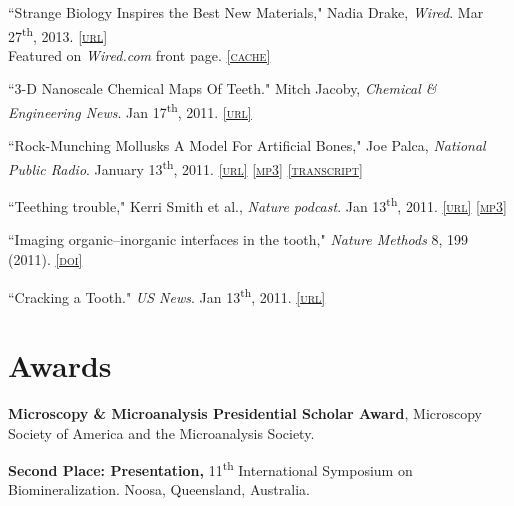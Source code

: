 ``Strange Biology Inspires the Best New Materials," Nadia Drake, \emph{Wired}. Mar 27\textsuperscript{th}, 2013. \href{http://www.wired.com/wiredscience/2013/03/biomimetic-materials/?utm_source=feedburner&utm_medium=feed&utm_campaign=Feed%3A+wired%2Findex+%28Wired%3A+Top+Stories%29&pid=6577}{\textsc{\footnotesize{[url]}}}\\ Featured on \emph{Wired.com} front page. \href{http://lylegordon.ca/wired.jpg}{\textsc{\footnotesize{[cache]}}}

 ``3-D Nanoscale Chemical Maps Of Teeth." Mitch Jacoby, \emph{Chemical \& Engineering News}. Jan 17\textsuperscript{th}, 2011. \href{http://pubs.acs.org/cen/science/89/8903scic1.html?utm_source=feedburner&utm_medium=feed&utm_campaign=Feed%3A+cen_nano+%28Chemical+And+Engineering+News+NanoFocus%29}{\textsc{\footnotesize{[url]}}}

``Rock-Munching Mollusks A Model For Artificial Bones," Joe Palca, \emph{National Public Radio}. January 13\textsuperscript{th}, 2011. \href{http://www.npr.org/2011/01/13/132859853/rock-munching-mollusks-a-model-for-artificial-bones}{\textsc{\footnotesize{[url]}}} \href{http://lylegordon.ca/audio/npr-2011-01-13.mp3}{\textsc{\footnotesize{[mp3]}}}  \href{http://lylegordon.ca/nprtranscript.html}{\textsc{\footnotesize{[transcript]}}}

``Teething trouble," Kerri Smith et al., \emph{Nature podcast}. Jan 13\textsuperscript{th}, 2011. \href{http://www.nature.com/nature/podcast/index-2011-01-13.html}{\textsc{\footnotesize{[url]}}} \href{http://lylegordon.ca/audio/nature-2011-01-13.mp3}{\textsc{\footnotesize{[mp3]}}}

``Imaging organic--inorganic interfaces in the tooth," \emph{Nature Methods} 8, 199 (2011). \href{http://dx.doi.org/10.1038/nmeth0311-199}{\textsc{\footnotesize{[doi]}}}

 ``Cracking a Tooth." \emph{US News}. Jan 13\textsuperscript{th}, 2011. \href{http://www.usnews.com/science/articles/2011/01/13/cracking-a-tooth}{\textsc{\footnotesize{[url]}}}
\endgroup

\section*{Awards}
\textbf{Microscopy \& Microanalysis Presidential Scholar Award}, Microscopy Society of America and the Microanalysis Society.

\begingroup\setlength{\parskip}{0.1cm}
\textbf{Second Place: Presentation,} 11\textsuperscript{th} International Symposium on Biomineralization. Noosa, Queensland, Australia.

